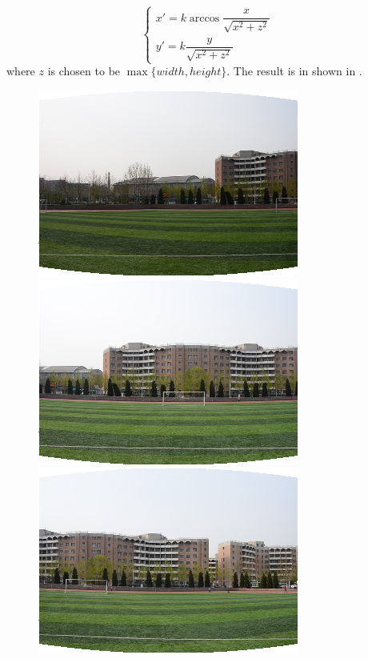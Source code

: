 \begin{enumerate}
    \[  \begin{cases}
        x' = k\arccos{\dfrac{x}{\sqrt{x^2 + z^2}}}\\
        y' = k\dfrac{y}{\sqrt{x^2 + z^2}}
      \end{cases}\]
    where $ z$ is chosen to be $ \max\{width, height\}$.  The result is in shown in .
    \begin{figure}[H]
      \centering
      \begin{minipage}[b]{0.24\linewidth}
        \includegraphics[scale=0.3]{res/1.png}
      \end{minipage}
      \begin{minipage}[b]{0.24\linewidth}
        \includegraphics[scale=0.3]{res/2.png}
      \end{minipage}
      \begin{minipage}[b]{0.24\linewidth}
        \includegraphics[scale=0.3]{res/3.png}

\end{minipage}
\end{figure}
\end{enumerate}
